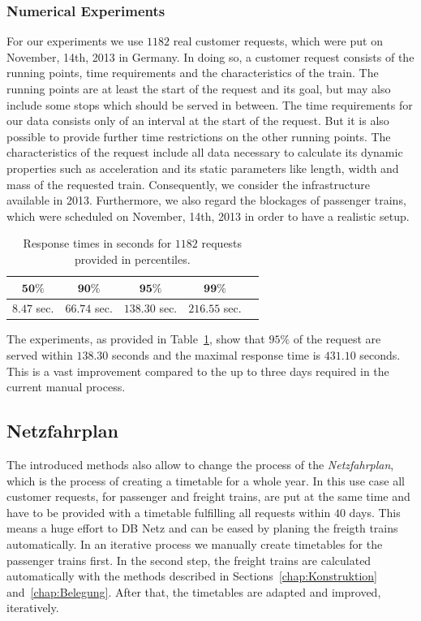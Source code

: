 \subsubsection{Numerical Experiments}
For our experiments we use $1182$ real customer requests, which were put on November, 14th, 2013 in Germany. In doing so, a customer request consists of the running points, time requirements and the characteristics of the train. The running points are at least the start of the request and its goal, but may also include some stops which should be served in between. The time requirements for our data consists only of an interval at the start of the request. But it is also possible to provide further time restrictions on the other running points. The characteristics of the request include all data necessary to calculate its dynamic properties such as acceleration and its static parameters like length, width and mass of the requested train. Consequently, we consider the infrastructure available in 2013. Furthermore, we also regard the blockages of passenger trains, which were scheduled on November, 14th, 2013 in order to have a realistic setup.
%
\begin{table}[h]
	\centering
	\caption{Response times in seconds for $1182$ requests provided in percentiles.}
	\label{tab:result_CnR}
	\begin{tabular}{ccccc} \hline
		$\textbf{50\%}$ & $\textbf{90\%}$ & $\textbf{95\%}$ & $\textbf{99\%}$ \\ \hline
		$8.47$ sec.     & $66.74$ sec.    & $138.30$ sec.   & $216.55$ sec.   \\
	\end{tabular}
\end{table}
\par

The experiments, as provided in Table~\ref{tab:result_CnR}, show that $95\%$ of the request are served within $138.30$ seconds and the maximal response time is $431.10$ seconds. This is a vast improvement compared to the up to three days required in the current manual process.

\subsection{Netzfahrplan}
\label{chap:Netzfahrplan}

The introduced methods also allow to change the process of the \emph{Netzfahrplan}, which is the process of creating a timetable for a whole year. In this use case all customer requests, for passenger and freight trains, are put at the same time and have to be provided with a timetable fulfilling all requests within $40$ days. This means a huge effort to DB Netz and can be eased by planing the freigth trains automatically. In an iterative process we manually create timetables for the passenger trains first. In the second step, the freight trains are calculated automatically with the methods described in Sections~\ref{chap:Konstruktion} and~\ref{chap:Belegung}. After that, the timetables are adapted and improved, iteratively.

